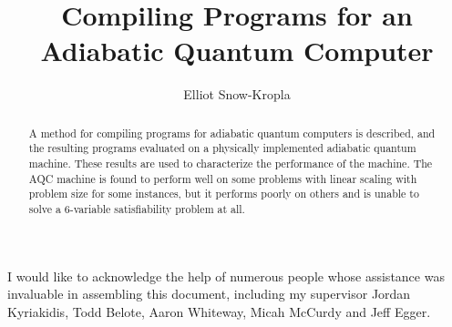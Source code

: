 \documentclass[12pt,glossary]{dalthesis}
\begin{document}
\title{Compiling Programs for an Adiabatic Quantum Computer}
\author{Elliot Snow-Kropla}






\frontmatter

\begin{abstract}
	A method for compiling programs for adiabatic quantum computers is described, and the resulting programs evaluated on a physically implemented adiabatic quantum machine.  These results are used to characterize the performance of the machine.  The AQC machine is found to perform well on some problems with linear scaling with problem size for some instances, but it performs poorly on others and is unable to solve a 6-variable satisfiability problem at all.

\end{abstract}

\printglossary

\begin{acknowledgements}
	I would like to acknowledge the help of numerous people whose assistance was invaluable in assembling this document, including my supervisor Jordan Kyriakidis, Todd Belote, Aaron Whiteway, Micah McCurdy and Jeff Egger.
\end{acknowledgements}

\mainmatter



%




%





\end{document}
